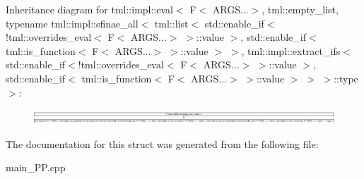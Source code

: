 Inheritance diagram for tml\+:\+:impl\+:\+:eval$<$ F$<$ A\+R\+G\+S...$>$, tml\+:\+:empty\+\_\+list, typename tml\+:\+:impl\+:\+:sfinae\+\_\+all$<$ tml\+:\+:list$<$ std\+:\+:enable\+\_\+if$<$!tml\+:\+:overrides\+\_\+eval$<$ F$<$ A\+R\+G\+S...$>$ $>$\+:\+:value $>$, std\+:\+:enable\+\_\+if$<$ tml\+:\+:is\+\_\+function$<$ F$<$ A\+R\+G\+S...$>$ $>$\+:\+:value $>$ $>$, tml\+:\+:impl\+:\+:extract\+\_\+ifs$<$ std\+:\+:enable\+\_\+if$<$!tml\+:\+:overrides\+\_\+eval$<$ F$<$ A\+R\+G\+S...$>$ $>$\+:\+:value $>$, std\+:\+:enable\+\_\+if$<$ tml\+:\+:is\+\_\+function$<$ F$<$ A\+R\+G\+S...$>$ $>$\+:\+:value $>$ $>$ $>$\+:\+:type $>$\+:\begin{figure}[H]
\begin{center}
\leavevmode
\includegraphics[height=0.555005cm]{structtml_1_1impl_1_1eval_3_01F_3_01ARGS_8_8_8_4_00_01tml_1_1empty__list_00_01typename_01tml_1_11a14574879a65bbd96b8bf90e68a90a4}
\end{center}
\end{figure}


The documentation for this struct was generated from the following file\+:\begin{DoxyCompactItemize}
\item 
main\+\_\+\+P\+P.\+cpp\end{DoxyCompactItemize}
